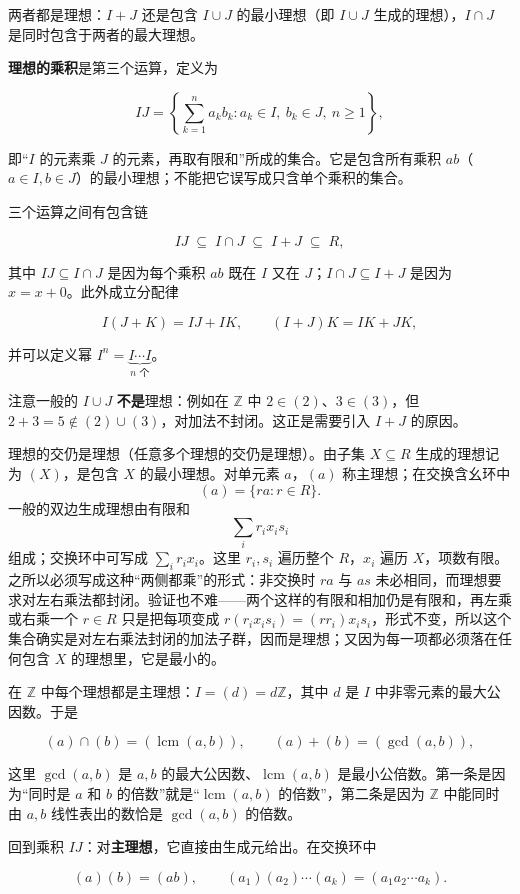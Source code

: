 两者都是理想：$I+J$ 还是包含 $I\cup J$ 的最小理想（即 $I\cup J$ 生成的理想），$I\cap J$ 是同时包含于两者的最大理想。

\textbf{理想的乘积}是第三个运算，定义为

\[
IJ=\left\{\sum_{k=1}^n a_kb_k:a_k\in I,\ b_k\in J,\ n\ge1\right\},
\]

即“$I$ 的元素乘 $J$ 的元素，再取有限和”所成的集合。它是包含所有乘积 $ab$（$a\in I,b\in J$）的最小理想；不能把它误写成只含单个乘积的集合。

三个运算之间有包含链

\[
IJ\;\subseteq\;I\cap J\;\subseteq\;I+J\;\subseteq\;R,
\]

其中 $IJ\subseteq I\cap J$ 是因为每个乘积 $ab$ 既在 $I$ 又在 $J$；$I\cap J\subseteq I+J$ 是因为 $x=x+0$。此外成立分配律

\[
I(J+K)=IJ+IK,\qquad (I+J)K=IK+JK,
\]

并可以定义幂 $I^n=\underbrace{I\cdots I}_{n\text{ 个}}$。

注意一般的 $I\cup J$ \textbf{不是}理想：例如在 $\mathbb Z$ 中 $2\in(2)$、$3\in(3)$，但 $2+3=5\notin(2)\cup(3)$，对加法不封闭。这正是需要引入 $I+J$ 的原因。

理想的交仍是理想（任意多个理想的交仍是理想）。由子集 $X\subseteq R$ 生成的理想记为 $(X)$，是包含 $X$ 的最小理想。对单元素 $a$，$(a)$ 称主理想；在交换含幺环中
\[ (a)=\{ra:r\in R\}.\]
一般的双边生成理想由有限和
\[\sum_i r_i x_i s_i\]
组成；交换环中可写成 $\sum_i r_i x_i$。这里 $r_i,s_i$ 遍历整个 $R$，$x_i$ 遍历 $X$，项数有限。之所以必须写成这种“两侧都乘”的形式：非交换时 $ra$ 与 $as$ 未必相同，而理想要求对左右乘法都封闭。验证也不难——两个这样的有限和相加仍是有限和，再左乘或右乘一个 $r\in R$ 只是把每项变成 $r(r_ix_is_i)= (rr_i)x_is_i$，形式不变，所以这个集合确实是对左右乘法封闭的加法子群，因而是理想；又因为每一项都必须落在任何包含 $X$ 的理想里，它是最小的。

在 $\mathbb Z$ 中每个理想都是主理想：$I=(d)=d\mathbb Z$，其中 $d$ 是 $I$ 中非零元素的最大公因数。于是

\[ (a)\cap(b)=(\operatorname{lcm}(a,b)),\qquad (a)+(b)=(\gcd(a,b)), \]

这里 $\gcd(a,b)$ 是 $a,b$ 的最大公因数、$\operatorname{lcm}(a,b)$ 是最小公倍数。第一条是因为“同时是 $a$ 和 $b$ 的倍数”就是“$\operatorname{lcm}(a,b)$ 的倍数”，第二条是因为 $\mathbb Z$ 中能同时由 $a,b$ 线性表出的数恰是 $\gcd(a,b)$ 的倍数。

回到乘积 $IJ$：对\textbf{主理想}，它直接由生成元给出。在交换环中

\[
(a)(b)=(ab),\qquad (a_1)(a_2)\cdots(a_k)=(a_1a_2\cdots a_k).
\]

